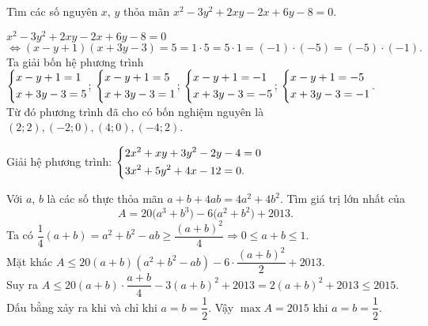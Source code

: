 \begin{ex}%
Tìm các số nguyên $x$, $y$ thỏa mãn $x^2 - 3y^2 + 2xy - 2x +  6y  - 8 = 0$.
\loigiai
    { $x^2 - 3y^2 + 2xy - 2x + 6y - 8 = 0$\\
    		$\Leftrightarrow \left(x-y+1\right)\left(x+3y-3\right)=5=1\cdot5=5\cdot1=\left(-1\right)\cdot\left(-5\right)=\left(-5\right)\cdot\left(-1\right).$\\
    		Ta giải bốn hệ phương trình\\
    		$\left\{\begin{aligned}& x-y+1=1 \\
    		& x+3y-3=5\end{aligned}\right. $; $\left\{\begin{aligned}& x-y+1=5 \\
    		& x+3y-3=1\end{aligned}\right.$; $\left\{\begin{aligned}& x-y+1=-1 \\
    		& x+3y-3=-5\end{aligned}\right.$; $\left\{\begin{aligned}& x-y+1=-5 \\
    		& x+3y-3=-1\end{aligned}\right.$.\\
    	Từ đó phương trình đã cho có bốn nghiệm nguyên là $\left(2;2\right), \left(-2;0\right), \left(4;0\right), \left(-4;2\right)$.
    	
    }
\end{ex}
\begin{ex}%
Giải hệ phương trình:   $\left\{\begin{aligned}&
	2x^2  + xy + 3y^2 - 2y - 4 = 0\\
	&3x^2  + 5y^2 + 4x - 12 = 0.\end{aligned}\right.$
\end{ex}
\begin{ex}%
       Với  $a$, $b$ là các số thực thỏa mãn $a + b  + 4ab  = 4a^2 +  4b^2$. Tìm giá trị lớn nhất của   
       $$A =  20\big(a^3 + b^3\big) - 6\big(a^2 + b^2\big) + 2013.$$ 
\loigiai
    {Ta có $\dfrac{1}{4}\left(a+b\right)=a^2+b^2-ab\geqslant \dfrac{{\left(a+b\right)}^2}{4}\Rightarrow 0\leqslant a+b\leqslant 1$.\\
    	Mặt khác $A\leqslant 20\left(a+b\right)\left(a^2+b^2-ab\right)-6\cdot\dfrac{{\left(a+b\right)}^2}{2}+2013$.\\
    	Suy ra $A\leqslant 20\left({a+b}\right)\cdot\dfrac{a+b}{4}-3\left({a+b}\right)^2+2013=2\left({a+b}\right)^2+2013\leqslant 2015$.\\
    	Dấu bằng xảy ra khi và chỉ khi $a=b=\dfrac{1}{2}$.
    	Vậy $\max A=2015$ khi $a=b=\dfrac{1}{2}$.
    }
\end{ex}
